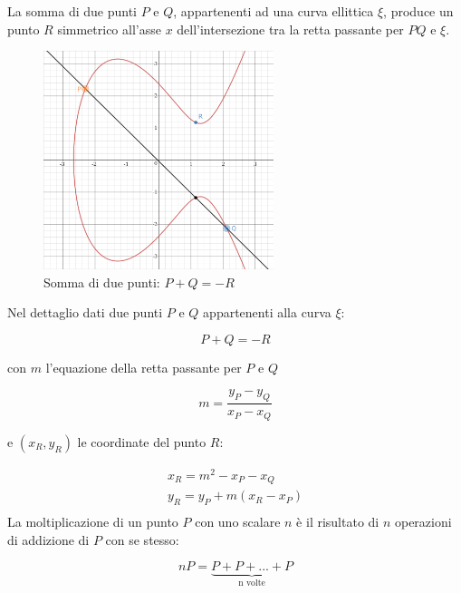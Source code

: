 La somma di due punti $P$ e $Q$, appartenenti ad una curva ellittica $\xi$, produce un punto $R$ simmetrico all'asse $x$ dell'intersezione tra la retta passante per $PQ$ e $\xi$.
\begin{figure}
    \centering
    \includegraphics[width=0.6\textwidth]{images/ECDSA.png}
    \caption{Somma di due punti: $P+Q=-R$}
    \label{fig:ECDSA}
\end{figure}
Nel dettaglio dati due punti $P$ e $Q$ appartenenti alla curva $\xi$:

\begin{equation}
    P + Q = -R
\end{equation}

con $m$ l'equazione della retta passante per $P$ e $Q$

\begin{equation}
    m=\frac{y_P-y_Q}{x_P-x_Q}
\end{equation}

e $(x_R,y_R)$ le coordinate del punto $R$:

\begin{equation}
    \begin{split}
        x_R = m^2 - x_P - x_Q\\
        y_R = y_P + m(x_R - x_P)\\
    \end{split}
\end{equation}
La moltiplicazione di un punto $P$ con uno scalare $n$ è il risultato di $n$ operazioni di addizione di $P$ con se stesso:

\begin{equation}
    nP = \underbrace{P + P + ... + P}_\text{n volte}
\end{equation}

